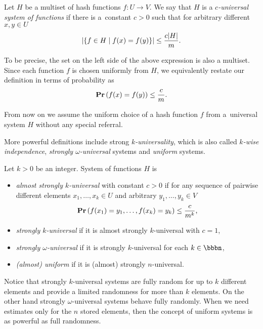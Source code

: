 \begin{definition}
\label{definition-c-universal-system}
Let $H$ be a multiset of hash functions $f\colon U \rightarrow V$. We say that $H$ is a \emph{$c$-universal system of functions} if there is a~constant $c > 0$ such that for arbitrary different $x, y \in U$
\[
\left|\lbrace f \in H \mid f(x) = f(y) \rbrace\right| \leq \frac{c|H|}{m}.
\]
\end{definition}

To be precise, the set on the left side of the above expression is also a multiset. Since each function $f$ is chosen uniformly from $H$, we equivalently restate our definition in terms of probability as
\[
\mathbf{Pr}\left(f(x) = f(y)\right) \leq \frac{c}{m}.
\]

From now on we assume the uniform choice of a hash function $f$ from a~universal system $H$ without any special referral.

More powerful definitions include strong \emph{$k$-universality}, which is also called \emph{$k$-wise independence}, \emph{strongly $\omega$-universal} systems and \emph{uniform} systems.
\begin{definition}
Let $k > 0$ be an integer. System of functions $H$ is
\begin{itemize}
	\item \emph{almost strongly $k$-universal} with constant $c > 0$ if for any sequence of pairwise different elements $x_1, \dots, x_k \in U$ and arbitrary $y_1, \dots, y_k \in V$ \[\mathbf{Pr}\left(f(x_1) = y_1, \dots, f(x_k) = y_k\right) \leq \frac{c}{m^k}\mbox{,}\]
	\item \emph{strongly $k$-universal} \cite{DBLP:conf/focs/WegmanC79} if it is almost strongly $k$-universal with $c = 1$,
	\item \emph{strongly $\omega$-universal} \cite{DBLP:conf/focs/WegmanC79} if it is strongly $k$-universal for each $k \in \bbbn$,
	\item \emph{(almost) uniform} \cite{DBLP:journals/siamcomp/PaghP08} if it is (almost) strongly $n$-universal.
\end{itemize}
\end{definition}

Notice that strongly $k$-universal systems are fully random for up to $k$ different elements and provide a limited randomness for more than $k$ elements. On the other hand strongly $\omega$-universal systems behave fully randomly. When we need estimates only for the $n$ stored elements, then the concept of uniform systems is as powerful as full randomness.
